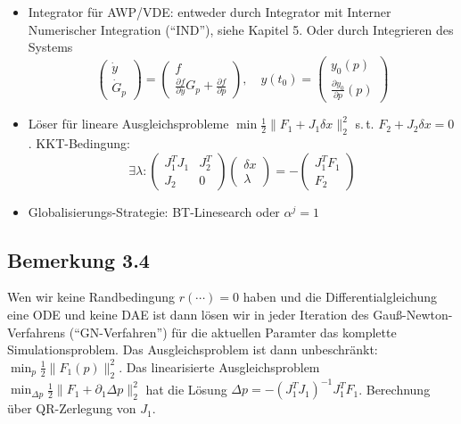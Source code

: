 \begin{itemize}
\item Integrator für AWP/VDE: entweder durch Integrator mit Interner Numerischer Integration ("`IND"'), siehe Kapitel 5. Oder durch Integrieren des Systems
\[\begin{pmatrix} \dot y \\ \dot G_p \end{pmatrix} = \begin{pmatrix} f \\ \frac{\partial f}{\partial y} G_p + \frac{\partial f}{\partial p}\end{pmatrix}, \quad y(t_0) = \begin{pmatrix} y_0(p) \\ \frac{\partial y_0}{\partial p}(p) \end{pmatrix} \]
\item Löser für lineare Ausgleichsprobleme $\min \tfrac 12 \|F_1 + J_1 \delta x\|_2^2$ s.\,t. $F_2 + J_2 \delta x = 0$. KKT-Bedingung:
\[ \exists \lambda\colon \begin{pmatrix} J_1^T J_1 & J_2^T \\ J_2 & 0 \end{pmatrix} \begin{pmatrix} \delta x \\ \lambda \end{pmatrix} = -\begin{pmatrix} J_1^T F_1 \\ F_2 \end{pmatrix} \]
\item Globalisierungs-Strategie: BT-Linesearch oder $\alpha^j = 1$
\end{itemize}









\subsection*{Bemerkung 3.4}

Wen wir keine Randbedingung $r(\cdots)=0$ haben und die Differentialgleichung eine ODE und keine DAE ist dann lösen wir in jeder Iteration des Gauß-Newton-Verfahrens ("`GN-Verfahren"') für die aktuellen Paramter das komplette Simulationsproblem. Das Ausgleichsproblem ist dann unbeschränkt: $\min_p \tfrac 12 \|F_1(p)\|_2^2$. Das linearisierte Ausgleichsproblem $\min_{\Delta p} \tfrac 12 \|F_1 + \partial_1 \Delta p\|_2^2$ hat die Lösung $\Delta p = -(J_1^T J_1)^{-1} J_1^T F_1$. Berechnung über QR-Zerlegung von $J_1$.

